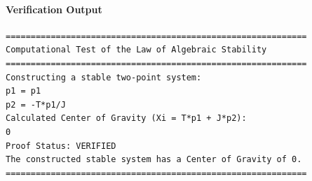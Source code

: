 \paragraph{Verification Output}
\begin{verbatim}
============================================================
Computational Test of the Law of Algebraic Stability
============================================================
Constructing a stable two-point system:
p1 = p1
p2 = -T*p1/J
Calculated Center of Gravity (Xi = T*p1 + J*p2):
0
Proof Status: VERIFIED
The constructed stable system has a Center of Gravity of 0.
============================================================
\end{verbatim}